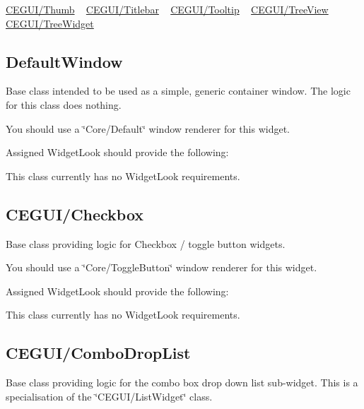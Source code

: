  \mbox{\hyperlink{fal_baseclass_ref_fal_baseclass_ref_sec_27}{C\+E\+G\+U\+I/\+Thumb}} ~\newline
 \mbox{\hyperlink{fal_baseclass_ref_fal_baseclass_ref_sec_28}{C\+E\+G\+U\+I/\+Titlebar}} ~\newline
 \mbox{\hyperlink{fal_baseclass_ref_fal_baseclass_ref_sec_29}{C\+E\+G\+U\+I/\+Tooltip}} ~\newline
 \mbox{\hyperlink{fal_baseclass_ref_fal_baseclass_ref_sec_30}{C\+E\+G\+U\+I/\+Tree\+View}} ~\newline
 \mbox{\hyperlink{fal_baseclass_ref_fal_baseclass_ref_sec_31}{C\+E\+G\+U\+I/\+Tree\+Widget}} ~\newline
\hypertarget{fal_baseclass_ref_fal_baseclass_ref_sec_1}{}\subsection{Default\+Window}\label{fal_baseclass_ref_fal_baseclass_ref_sec_1}
Base class intended to be used as a simple, generic container window. The logic for this class does nothing.

You should use a \char`\"{}\+Core/\+Default\char`\"{} window renderer for this widget.

Assigned Widget\+Look should provide the following\+: 
\begin{DoxyItemize}
\item This class currently has no Widget\+Look requirements. 
\end{DoxyItemize}\hypertarget{fal_baseclass_ref_fal_baseclass_ref_sec_2}{}\subsection{C\+E\+G\+U\+I/\+Checkbox}\label{fal_baseclass_ref_fal_baseclass_ref_sec_2}
Base class providing logic for Checkbox / toggle button widgets.

You should use a \char`\"{}\+Core/\+Toggle\+Button\char`\"{} window renderer for this widget.

Assigned Widget\+Look should provide the following\+: 
\begin{DoxyItemize}
\item This class currently has no Widget\+Look requirements. 
\end{DoxyItemize}\hypertarget{fal_baseclass_ref_fal_baseclass_ref_sec_3}{}\subsection{C\+E\+G\+U\+I/\+Combo\+Drop\+List}\label{fal_baseclass_ref_fal_baseclass_ref_sec_3}
Base class providing logic for the combo box drop down list sub-\/widget. This is a specialisation of the \char`\"{}\+C\+E\+G\+U\+I/\+List\+Widget\char`\"{} class.

